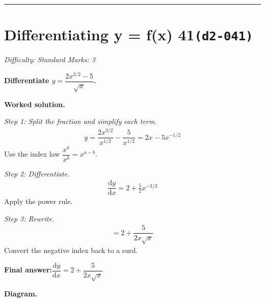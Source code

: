 \documentclass[11pt]{article}
\newcommand{\question}[1]{\par\medskip\noindent\textbf{#1}\par}
\begin{document}
\medskip\hrule

\section*{Differentiating y = f(x) 41\quad\small\texttt{(d2-041)}}
\textit{Difficulty: Standard \quad\textbar\quad Marks: 3}

\question{Differentiate \( y = \dfrac{2x^{3/2} - 5}{\sqrt{x}} \).}

\textbf{Worked solution.}

\textit{Step 1: Split the fraction and simplify each term.}
\[\begin{gathered}
y = \dfrac{2x^{3/2}}{x^{1/2}} - \dfrac{5}{x^{1/2}} = 2x - 5x^{-1/2}
\end{gathered}\]
Use the index law \( \dfrac{x^a}{x^b} = x^{a-b} \).

\textit{Step 2: Differentiate.}
\[\begin{gathered}
\dfrac{\mathrm{d}y}{\mathrm{d}x} = 2 + \tfrac{5}{2} x^{-3/2}
\end{gathered}\]
Apply the power rule.

\textit{Step 3: Rewrite.}
\[\begin{gathered}
= 2 + \dfrac{5}{2x\sqrt{x}}
\end{gathered}\]
Convert the negative index back to a surd.

\begin{answerbox}
\textbf{Final answer:}\quad \(\displaystyle  \dfrac{\mathrm{d}y}{\mathrm{d}x} = 2 + \dfrac{5}{2x\sqrt{x}} \)
\end{answerbox}
\textbf{Diagram.}
\end{document}
